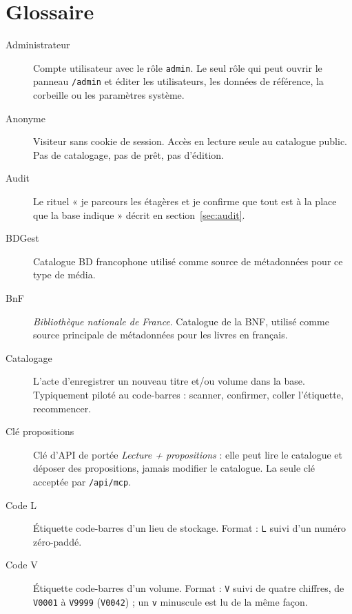 \chapter{Glossaire}
\label{ch:glossary}

\begin{description}

  \item[Administrateur] Compte utilisateur
        avec le rôle \texttt{admin}. Le seul rôle qui peut ouvrir
        le panneau \texttt{/admin} et éditer les utilisateurs, les
        données de référence, la corbeille ou les paramètres
        système.

  \item[Anonyme] Visiteur sans cookie de session.
        Accès en lecture seule au catalogue public. Pas de
        catalogage, pas de prêt, pas d'édition.

  \item[Audit] Le rituel « je parcours les étagères
        et je confirme que tout est à la place que la base
        indique » décrit en section~\ref{sec:audit}.

  \item[BDGest] Catalogue BD francophone utilisé comme
        source de métadonnées pour ce type de média.

  \item[BnF] \textit{Bibliothèque nationale de France}.
        Catalogue de la BNF, utilisé comme source principale de
        métadonnées pour les livres en français.

  \item[Catalogage] L'acte d'enregistrer un nouveau titre et/ou
        volume dans la base. Typiquement piloté au code-barres :
        scanner, confirmer, coller l'étiquette, recommencer.

  \item[Clé propositions] Clé d'API de
        portée \emph{Lecture + propositions} : elle peut lire le
        catalogue et déposer des propositions, jamais modifier le
        catalogue. La seule clé acceptée par \texttt{/api/mcp}.

  \item[Code L] Étiquette code-barres d'un lieu de
        stockage. Format : \texttt{L} suivi d'un numéro
        zéro-paddé.

  \item[Code V] Étiquette code-barres d'un volume.
        Format : \texttt{V} suivi de quatre chiffres, de \texttt{V0001} à
        \texttt{V9999} (\texttt{V0042}) ;
        un \texttt{v} minuscule est lu de la même façon.


\end{description}
